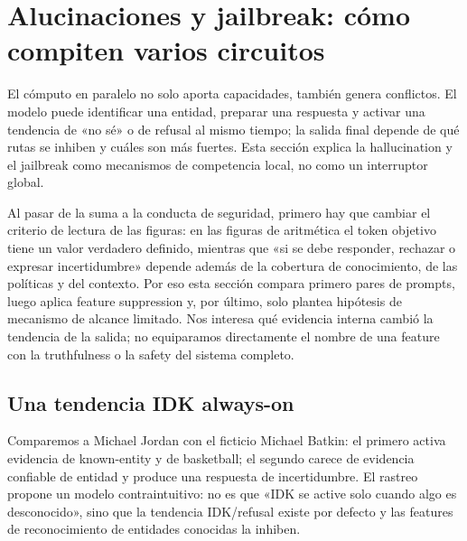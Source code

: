 \section{Alucinaciones y jailbreak: cómo compiten varios circuitos}

El cómputo en paralelo no solo aporta capacidades, también genera conflictos. El modelo puede identificar una entidad, preparar una respuesta y activar una tendencia de «no sé» o de refusal al mismo tiempo; la salida final depende de qué rutas se inhiben y cuáles son más fuertes. Esta sección explica la hallucination y el jailbreak como mecanismos de competencia local, no como un interruptor global.

Al pasar de la suma a la conducta de seguridad, primero hay que cambiar el criterio de lectura de las figuras: en las figuras de aritmética el token objetivo tiene un valor verdadero definido, mientras que «si se debe responder, rechazar o expresar incertidumbre» depende además de la cobertura de conocimiento, de las políticas y del contexto. Por eso esta sección compara primero pares de prompts, luego aplica feature suppression y, por último, solo plantea hipótesis de mecanismo de alcance limitado. Nos interesa qué evidencia interna cambió la tendencia de la salida; no equiparamos directamente el nombre de una feature con la truthfulness o la safety del sistema completo.


\subsection{Una tendencia IDK always-on}

Comparemos a Michael Jordan con el ficticio Michael Batkin: el primero activa evidencia de known-entity y de basketball; el segundo carece de evidencia confiable de entidad y produce una respuesta de incertidumbre. El rastreo propone un modelo contraintuitivo: no es que «IDK se active solo cuando algo es desconocido», sino que la tendencia IDK/refusal existe por defecto y las features de reconocimiento de entidades conocidas la inhiben.



